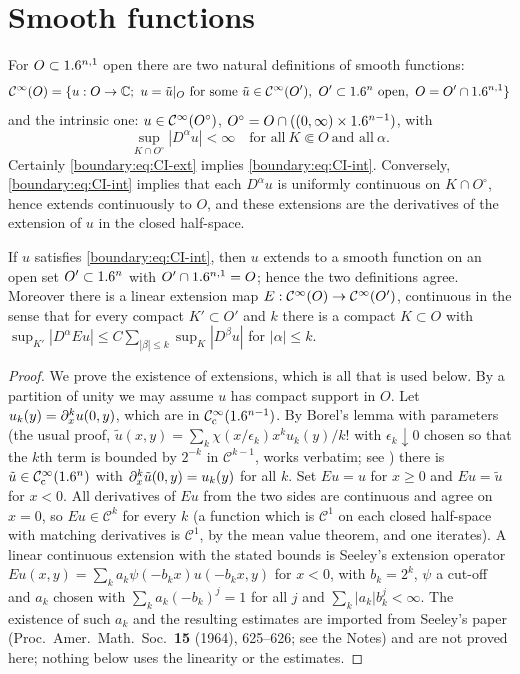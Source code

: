 \section{Smooth functions}\label{boundary:sec:smooth}

For $O\subset1.6^{n,1}$ open there are two natural definitions of smooth functions:
\begin{equation}\label{boundary:eq:CI-ext}
\CI(O)=\{u:O\to\C;\ u=\tilde u|_O\ \text{for some}\ \tilde u\in\CI(O'),\ O'\subset
\R^n\ \text{open},\ O=O'\cap\R^{n,1}\}
\end{equation}
and the intrinsic one: $u\in\mathcal{C}^\infty(O^\circ)$, $O^\circ=O\cap((0,\infty)\times1.6^{n-1})$,
with
\begin{equation}\label{boundary:eq:CI-int}
\sup_{K\cap O^\circ}|D^\alpha u|<\infty\quad\text{for all}\ K\Subset O\ \text{and
all}\ \alpha.
\end{equation}
Certainly \eqref{boundary:eq:CI-ext} implies \eqref{boundary:eq:CI-int}. Conversely,
\eqref{boundary:eq:CI-int} implies that each $D^\alpha u$ is uniformly continuous on
$K\cap O^\circ$, hence extends continuously to $O$, and these extensions are the
derivatives of the extension of $u$ in the closed half-space.

\begin{proposition}\label{boundary:prop:extension}
If $u$ satisfies \eqref{boundary:eq:CI-int}, then $u$ extends to a smooth function on
an open set $O'\subset1.6^n$ with $O'\cap1.6^{n,1}=O$; hence the two definitions agree.
Moreover there is a linear extension map $E:\mathcal{C}^\infty(O)\to\mathcal{C}^\infty(O')$, continuous in the sense
that for every compact $K'\subset O'$ and $k$ there is a compact $K\subset O$ with
$\sup_{K'}|D^\alpha Eu|\le C\sum_{|\beta|\le k}\sup_{K}|D^\beta u|$ for $|\alpha|\le k$.
\end{proposition}
\begin{proof}
We prove the existence of extensions, which is all that is used below. By a
partition of unity we may assume $u$ has compact support in $O$. Let
$u_k(y)=\partial_x^ku(0,y)$, which are in $\mathcal{C}^\infty_{\mathrm{c}}(1.6^{n-1})$. By Borel's lemma with
parameters (the usual proof, $\tilde u(x,y)=\sum_k\chi(x/\epsilon_k)x^ku_k(y)/k!$ with
$\epsilon_k\downarrow0$ chosen so that the $k$th term is bounded by $2^{-k}$ in
$\mathcal{C}^{k-1}$, works verbatim; see \cite[Section~1.2]{Hormander-I}) there is
$\tilde u\in\mathcal{C}^\infty_{\mathrm{c}}(1.6^n)$ with $\partial_x^k\tilde u(0,y)=u_k(y)$ for all $k$. Set $Eu=u$ for
$x\ge0$ and $Eu=\tilde u$ for $x<0$. All derivatives of $Eu$ from the two sides are
continuous and agree on $x=0$, so $Eu\in\mathcal{C}^k$ for every $k$ (a function
which is $\mathcal{C}^1$ on each closed half-space with matching derivatives is
$\mathcal{C}^1$, by the mean value theorem, and one iterates). A linear continuous
extension with the stated bounds is Seeley's extension operator $Eu(x,y)=
\sum_k a_k\psi(-b_kx)u(-b_kx,y)$ for $x<0$, with $b_k=2^k$, $\psi$ a cut-off and
$a_k$ chosen with $\sum_ka_k(-b_k)^j=1$ for all $j$ and $\sum_k|a_k|b_k^j<\infty$. The
existence of such $a_k$ and the resulting estimates are imported from Seeley's paper
(Proc.\ Amer.\ Math.\ Soc.\ \textbf{15} (1964), 625--626; see the Notes) and are not
proved here; nothing below uses the linearity or the estimates.
\end{proof}


